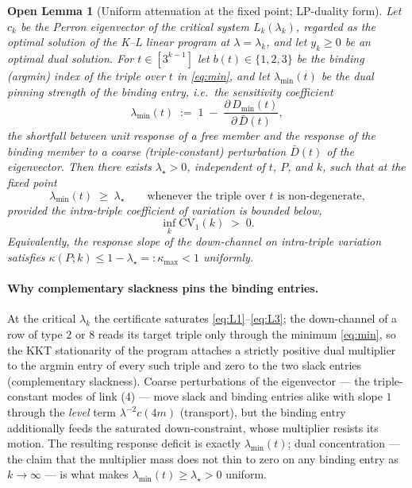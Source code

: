 \documentclass[11pt]{article}
\newtheorem{openlemma}[theorem]{Open Lemma}
\theoremstyle{definition}
\theoremstyle{remark}
\newcommand{\CV}{\mathrm{CV}}
\newcommand{\lam}{\lambda}
\newcommand{\kap}{\kappa}
\begin{document}
\begin{openlemma}[Uniform attenuation at the fixed point; LP-duality form]
\label{open:precise}
Let $c_k$ be the Perron eigenvector of the critical system $L_k(\lam_k)$,
regarded as the optimal solution of the K--L linear program at $\lam = \lam_k$,
and let $y_k \geq 0$ be an optimal dual solution. For $t \in [3^{k-1}]$ let
$b(t) \in \{1, 2, 3\}$ be the binding (argmin) index of the triple over $t$
in \eqref{eq:min}, and let $\lam_{\min}(t)$ be the dual pinning strength of the
binding entry, i.e.\ the sensitivity coefficient
\[
\lam_{\min}(t)
\;:=\; 1 \;-\; \frac{\partial\, D_{\min}(t)}{\partial\, \bar D(t)} ,
\]
the shortfall between unit response of a free member and the response of the
binding member to a coarse (triple-constant) perturbation $\bar D(t)$ of the
eigenvector. Then there exists $\lam_\star > 0$, independent of $t$, $P$, and
$k$, such that at the fixed point
\[
\lam_{\min}(t) \;\geq\; \lam_\star
\qquad \text{whenever the triple over } t \text{ is non-degenerate,}
\]
provided the intra-triple coefficient of variation is bounded below,
\begin{equation}
\inf_k \CV_1(k) \;>\; 0 .
\label{eq:cv1pos}
\end{equation}
Equivalently, the response slope of the down-channel on intra-triple variation
satisfies $\kap(P; k) \leq 1 - \lam_\star =: \kap_{\max} < 1$ uniformly.
\end{openlemma}

\paragraph{Why complementary slackness pins the binding entries.}
At the critical $\lam_k$ the certificate saturates \eqref{eq:L1}--\eqref{eq:L3};
the down-channel of a row of type $2$ or $8$ reads its target triple only
through the minimum \eqref{eq:min}, so the KKT stationarity of the program
attaches a strictly positive dual multiplier to the argmin entry of every such
triple and zero to the two slack entries (complementary slackness). Coarse
perturbations of the eigenvector --- the triple-constant modes of link (4) ---
move slack and binding entries alike with slope $1$ through the \emph{level}
term $\lam^{-2} c(4m)$ (transport), but the binding entry additionally feeds the
saturated down-constraint, whose multiplier resists its motion. The resulting
response deficit is exactly $\lam_{\min}(t)$; dual concentration --- the claim
that the multiplier mass does not thin to zero on any binding entry as
$k \to \infty$ --- is what makes $\lam_{\min}(t) \geq \lam_\star > 0$ uniform.
\end{document}
